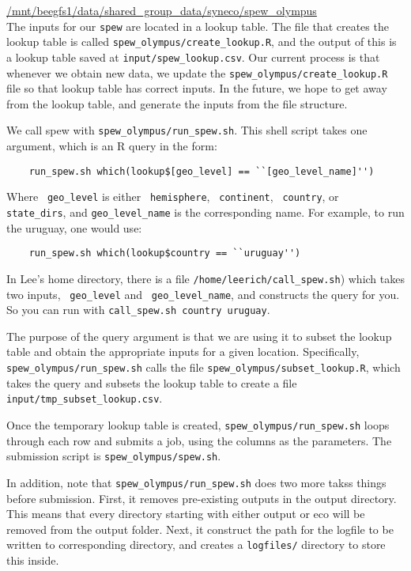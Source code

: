 \documentclass{article}
\begin{document}
\url{/mnt/beegfs1/data/shared_group_data/syneco/spew_olympus} \\

The inputs for our \verb|spew| are located in a lookup table. The file that creates the lookup table is called \verb|spew_olympus/create_lookup.R|, and the output of this is a lookup table saved at \verb|input/spew_lookup.csv|. Our current process is that whenever we obtain new data, we update the \verb|spew_olympus/create_lookup.R| file so that lookup table has correct inputs. In the future, we hope to get away from the lookup table, and generate the inputs from the file structure. 

We call spew with \verb|spew_olympus/run_spew.sh|. This shell script takes one argument, which is an R query in the form:

\begin{verbatim} 
	run_spew.sh which(lookup$[geo_level] == ``[geo_level_name]'')
\end{verbatim}

Where \verb| geo_level| is either \verb| hemisphere|, \verb| continent|, \verb| country|, or \verb| state_dirs|, and \verb|geo_level_name| is the corresponding name. For example, to run the uruguay, one would use:

\begin{verbatim} 
	run_spew.sh which(lookup$country == ``uruguay'')
\end{verbatim}

In Lee's home directory, there is a file \verb|/home/leerich/call_spew.sh|) which takes two inputs, \verb| geo_level| and \verb| geo_level_name|, and constructs the query for you. So you can run with \verb|call_spew.sh country uruguay|. 

The purpose of the query argument is that we are using it to subset the lookup table and obtain the appropriate inputs for a given location. Specifically, \verb|spew_olympus/run_spew.sh| calls the file \verb|spew_olympus/subset_lookup.R|, which takes the query and subsets the lookup table to create a file \verb|input/tmp_subset_lookup.csv|. 

Once the temporary lookup table is created, \verb|spew_olympus/run_spew.sh| loops through each row and submits a job, using the columns as the parameters. The submission script is \verb|spew_olympus/spew.sh|. 

In addition, note that \verb|spew_olympus/run_spew.sh| does two more takss things before submission. First, it removes pre-existing outputs in the output directory. This means that every directory starting with either output or eco will be removed from the output folder. Next, it construct the path for the logfile to be written to corresponding directory, and creates a \verb|logfiles/| directory to store this inside.
\end{document}
